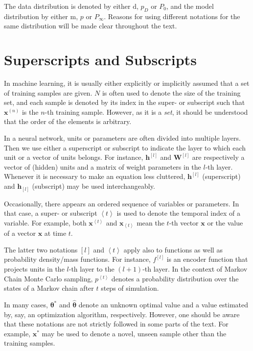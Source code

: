 \documentclass{now}
\newcommand{\qt}[1]{\left<#1\right>}
\newcommand{\qlay}[1]{\left[#1\right]}
\newcommand{\vect}[1]{\mathbf{#1}}
\newcommand{\vects}[1]{\boldsymbol{#1}}
\newcommand{\matr}[1]{\mathbf{#1}}
\newcommand{\vh}[0]{\vect{h}}
\newcommand{\vx}[0]{\vect{x}}
\newcommand{\mW}[0]{\matr{W}}
\newcommand{\td}[0]{\text{d}}
\newcommand{\tf}[0]{\text{m}}
\newcommand{\TT}[0]{{\vects{\theta}}}
\begin{document}
The data distribution is denoted by either $\td$, $p_D$ or $P_0$,
and the model distribution by either $\tf$, $p$ or $P_\infty$.
Reasons for using different notations for the same
distribution will be made clear throughout the text.


\section*{Superscripts and Subscripts}

In machine learning, it is usually either explicitly
or implicitly assumed that a set of training samples are
given. $N$ is often used to denote the size of the training set,
and each sample is denoted by its index in the super- or
subscript such that $\vx^{(n)}$ is the $n$-th training
sample. However, as it is a \textit{set}, it should be
understood that the order of the elements is arbitrary.

In a neural network, units or parameters are often divided
into multiple layers. Then we use either a superscript or
subscript to indicate the layer to which each unit or a
vector of units belongs. For instance, $\vh^{\qlay{l}}$ and
$\mW^{\qlay{l}}$ are respectively a vector of (hidden) units
and a matrix of weight parameters in the $l$-th layer.
Whenever it is necessary to make an equation less cluttered,
$\vh^{\qlay{l}}$ (superscript) and $\vh_{\qlay{l}}$
(subscript) may be used interchangeably.

Occasionally, there appears an ordered sequence of variables
or parameters. In that case, a super- or subscript $\qt{t}$
is used to denote the temporal index of a variable.  For
example, both $\vx^{\qt{t}}$ and $\vx_{\qt{t}}$ mean the
$t$-th vector $\vx$ or the value of a vector $\vx$ at time
$t$.

The latter two notations $\qlay{l}$ and $\qt{t}$ apply also
to functions as well as probability density/mass functions.
For instance, $f^{\qlay{l}}$ is an encoder function that
projects units in the $l$-th layer to the $(l+1)$-th layer.
In the context of Markov Chain Monte Carlo sampling, 
$p^{\qt{t}}$ denotes a probability distribution over the
states of a Markov chain after $t$ steps of simulation.

In many cases, $\TT^*$ and $\hat{\TT}$ denote an unknown
optimal value and a value estimated by, say, an optimization
algorithm, respectively. However, one should be aware that
these notations are not strictly followed in some parts of
the text. For example, $\vx^*$ may be used to denote a
novel, unseen sample other than the training samples.
\end{document}

